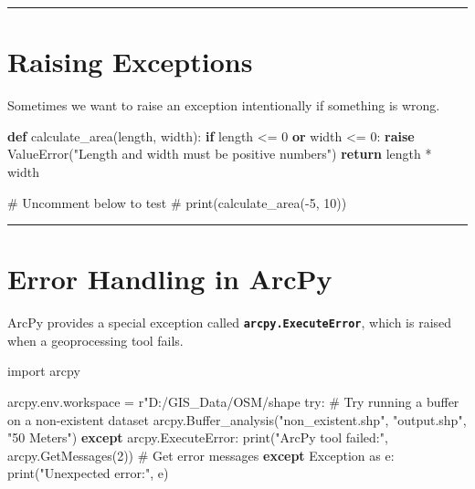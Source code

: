 \documentclass[
  11pt,
  letterpaper,
]{book}
\newenvironment{Shaded}{\begin{snugshade}}{\end{snugshade}}
\newcommand{\BuiltInTok}[1]{\textcolor[rgb]{0.00,0.23,0.31}{#1}}
\newcommand{\CommentTok}[1]{\textcolor[rgb]{0.37,0.37,0.37}{#1}}
\newcommand{\ControlFlowTok}[1]{\textcolor[rgb]{0.00,0.23,0.31}{\textbf{#1}}}
\newcommand{\DecValTok}[1]{\textcolor[rgb]{0.68,0.00,0.00}{#1}}
\newcommand{\ErrorTok}[1]{\textcolor[rgb]{0.68,0.00,0.00}{#1}}
\newcommand{\ImportTok}[1]{\textcolor[rgb]{0.00,0.46,0.62}{#1}}
\newcommand{\KeywordTok}[1]{\textcolor[rgb]{0.00,0.23,0.31}{\textbf{#1}}}
\newcommand{\NormalTok}[1]{\textcolor[rgb]{0.00,0.23,0.31}{#1}}
\newcommand{\OperatorTok}[1]{\textcolor[rgb]{0.37,0.37,0.37}{#1}}
\newcommand{\PreprocessorTok}[1]{\textcolor[rgb]{0.68,0.00,0.00}{#1}}
\newcommand{\StringTok}[1]{\textcolor[rgb]{0.13,0.47,0.30}{#1}}
\newcommand{\VerbatimStringTok}[1]{\textcolor[rgb]{0.13,0.47,0.30}{#1}}
\begin{document}
\begin{center}\rule{0.5\linewidth}{0.5pt}\end{center}

\section{Raising Exceptions}\label{raising-exceptions}

Sometimes we want to raise an exception intentionally if something is
wrong.

\begin{Shaded}
\begin{Highlighting}[]
\KeywordTok{def}\NormalTok{ calculate\_area(length, width):}
    \ControlFlowTok{if}\NormalTok{ length }\OperatorTok{\textless{}=} \DecValTok{0} \KeywordTok{or}\NormalTok{ width }\OperatorTok{\textless{}=} \DecValTok{0}\NormalTok{:}
        \ControlFlowTok{raise} \PreprocessorTok{ValueError}\NormalTok{(}\StringTok{"Length and width must be positive numbers"}\NormalTok{)}
    \ControlFlowTok{return}\NormalTok{ length }\OperatorTok{*}\NormalTok{ width}

\CommentTok{\# Uncomment below to test}
\CommentTok{\# print(calculate\_area({-}5, 10))}
\end{Highlighting}
\end{Shaded}

\begin{center}\rule{0.5\linewidth}{0.5pt}\end{center}

\section{Error Handling in ArcPy}\label{error-handling-in-arcpy}

ArcPy provides a special exception called
\textbf{\texttt{arcpy.ExecuteError}}, which is raised when a
geoprocessing tool fails.

\begin{Shaded}
\begin{Highlighting}[]
\ImportTok{import}\NormalTok{ arcpy}

\NormalTok{arcpy.env.workspace }\OperatorTok{=} \VerbatimStringTok{r"D:/GIS\_Data/OSM/shape}
\ErrorTok{try:}
    \CommentTok{\# Try running a buffer on a non{-}existent dataset}
\NormalTok{    arcpy.Buffer\_analysis(}\StringTok{"non\_existent.shp"}\NormalTok{, }\StringTok{"output.shp"}\NormalTok{, }\StringTok{"50 Meters"}\NormalTok{)}
\ControlFlowTok{except}\NormalTok{ arcpy.ExecuteError:}
    \BuiltInTok{print}\NormalTok{(}\StringTok{"ArcPy tool failed:"}\NormalTok{, arcpy.GetMessages(}\DecValTok{2}\NormalTok{))  }\CommentTok{\# Get error messages}
\ControlFlowTok{except} \PreprocessorTok{Exception} \ImportTok{as}\NormalTok{ e:}
    \BuiltInTok{print}\NormalTok{(}\StringTok{"Unexpected error:"}\NormalTok{, e)}
\end{Highlighting}
\end{Shaded}
\end{document}
